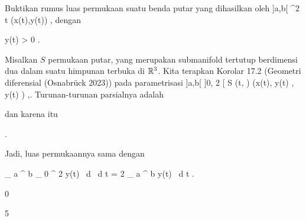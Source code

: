 {

Buktikan rumus luas permukaan suatu benda putar yang dihasilkan oleh
\maabbeledisp {\gamma} {]a,b[} {\R^2
} { t } {(x(t),y(t))
} {,}
dengan

\mavergleichskette
{\vergleichskette
{ y(t)
}
{ > }{ 0
}
{  }{
}
{    }{
}
{   }{
}
}
{}{}{.}

}
{

Misalkan $S$ permukaan putar, yang merupakan submanifold tertutup berdimensi dua dalam suatu himpunan terbuka di ${\mathbb R}^3$. Kita terapkan
Korolar 17.2 (Geometri diferensial (Osnabrück 2023))
pada parametrisasi
\maabbeledisp {} { ]a,b[ \times ]0, 2 \pi[} {S
} { (t, \alpha) } { (x(t),  y(t) \cos \alpha  , y(t) \sin \alpha  )
} {,}.
Turunan-turunan parsialnya adalah

 {  }

dan karena itu

 { . }

Jadi, luas permukaannya sama dengan

\mavergleichskettedisphandlinks
{\vergleichskettedisphandlinks
{ \int_{  a  }^{  b  } \int_{  0  }^{  2 \pi }  \cdot   y(t) \, d \alpha \, d t
}
{ =} { 2 \pi \int_{  a  }^{  b  }  \cdot   y(t) \, d t
}
{ } {
}
{ } {
}
{ } {
}
}
{}{}{.}

}



{0}

{

}
{  }



{5}

